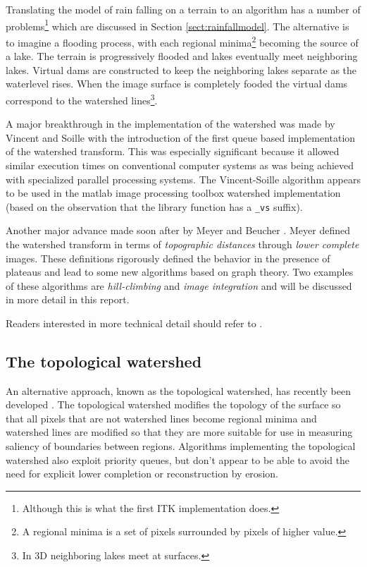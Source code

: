 \documentclass{InsightArticle}
\begin{document}
Translating the model of rain falling on a terrain to an algorithm has
a number of problems\footnote{Although this is what the first ITK
implementation does.} which are discussed in Section
\ref{sect:rainfallmodel}. The alternative is to imagine a flooding
process, with each regional minima\footnote{A regional minima is a set
of pixels surrounded by pixels of higher value.} becoming the source
of a lake. The terrain is progressively flooded and lakes eventually
meet neighboring lakes. Virtual dams are constructed to keep the
neighboring lakes separate as the waterlevel rises. When the image
surface is completely fooded the virtual dams correspond to the
watershed lines\footnote{In 3D neighboring lakes meet at surfaces.}.

A major breakthrough in the implementation of the watershed was made
by Vincent and Soille \cite{Vincent91a} with the introduction of the
first queue based implementation of the watershed transform. This was
especially significant because it allowed similar execution times on
conventional computer systems as was being achieved with specialized
parallel processing systems. The Vincent-Soille algorithm appears to
be used in the matlab image processing toolbox watershed
implementation (based on the observation that the library function has
a {\tt \_vs} suffix).

Another major advance made soon after by Meyer and Beucher
\cite{Beucher93a,Meyer1994a}. Meyer defined the watershed transform in terms of {\em
topographic distances} through {\em lower complete} images. These
definitions rigorously defined the behavior in the presence of
plateaus and lead to some new algorithms based on graph theory. Two
examples of these algorithms are {\em hill-climbing} and {\em image
integration} and will be discussed in more detail in this report.


Readers interested in more technical detail should refer to \cite{Roerdink2000a,Meijster2004a}.

\subsection{The topological watershed}
An alternative approach, known as the topological watershed, has
recently been developed \cite{}. The topological watershed modifies
the topology of the surface so that all pixels that are not watershed
lines become regional minima and watershed lines are modified so that
they are more suitable for use in measuring saliency of boundaries
between regions. Algorithms implementing the topological watershed
also exploit priority queues, but don't appear to be able to avoid the
need for explicit lower completion or reconstruction by erosion.
\end{document}
